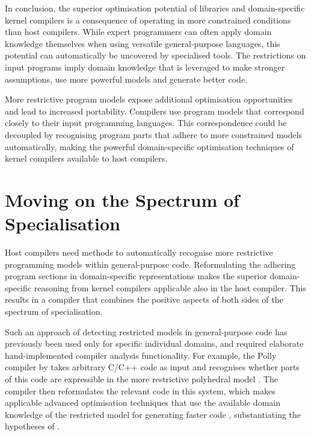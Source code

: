     In conclusion, the superior optimisation potential of libraries and
    domain-specific kernel compilers is a consequence of operating in more
    constrained conditions than host compilers.
    While expert programmers can often apply domain knowledge themselves
    when using versatile general-purpose languages, this potential can
    automatically be uncovered by specialised tools.
    The restrictions on input programs imply domain knowledge that is leveraged
    to make stronger assumptions, use more powerful models and generate better
    code.

    More restrictive program models expose additional optimisation
    opportunities and lead to increased portability.
    Compilers use program models that correspond closely to their input
    programming languages.
    This correspondence could be decoupled by recognising program parts that
    adhere to more constrained models automatically, making the powerful
    domain-specific optimisation techniques of kernel compilers available to
    host compilers.

\section{Moving on the Spectrum of Specialisation}

    Host compilers need methods to automatically recognise more
    restrictive programming models within general-purpose code.
    Reformulating the adhering program sections in domain-specific
    representations makes the superior domain-specific reasoning from kernel
    compilers applicable also in the host compiler.
    This results in a compiler that combines the positive aspects of both sides
    of the spectrum of specialisation.

    Such an approach of detecting restricted models in general-purpose code has
    previously been used only for specific individual domains, and required
    elaborate hand-implemented compiler analysis functionality.
    For example, the Polly compiler by \citet{Lengauer2012Polly} takes
    arbitrary C/C++ code as input and recognises whether parts of this code
    are expressible in the more restrictive polyhedral model
    \citep{Karp:1967:OCU:321406.321418,benabderrahmane2010polyhedral}.
    The compiler then reformulates the relevant code in this system, which
    makes applicable advanced optimisation techniques that use the available
    domain knowledge of the restricted model for generating faster code
    \citep{Moll:2016:ISS:2892208.2892217,Doerfert2015Polly}, substantiating the
    hypotheses of .

